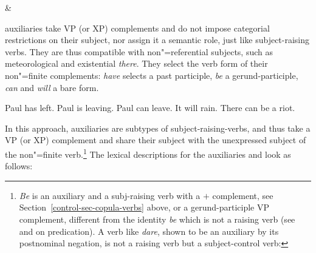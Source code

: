 \begin{exe}
\ex \label{ex-head-value-of-aux-elements}
   \impl {} \& 
\avm{[head &	[aux & $+$] ]}
 \end{exe}
 
  auxiliaries take VP (or XP) complements and do not impose categorial restrictions on their subject, nor assign it a semantic role,
   just like
 subject-raising verbs. They are thus compatible with non"=referential subjects, such as
 meteorological  and existential \textit{there}. They select the verb form of their
 non"=finite complements: \textit{have} selects a past participle, \textit{be} a gerund-participle,
 \textit{can} and \textit{will} a bare form.

	
\begin{exe}
\ex \begin{xlist}
\ex Paul has left.
\ex Paul is leaving.
\ex Paul can leave.
\ex It will rain.
\ex There can be a riot.
\end{xlist}	
\end{exe}

In this approach,  auxiliaries are subtypes of subject-raising-verbs, and thus take a VP (or
XP) complement and share their subject with the unexpressed subject of the non"=finite verb.\footnote{ \emph{Be} is an auxiliary and a subj-raising verb with a \prd$+$ complement, see
  Section~\ref{control-sec-copula-verbs} above, or a gerund-participle VP complement,
  different from the identity \emph{be} which is not a raising verb (see  and
   on predication). A verb like \emph{dare}, shown to be an auxiliary by
  its postnominal negation, is not a raising verb but a subject-control verb:
\eal
{}
\zllast
}
The lexical descriptions for the auxiliaries  and  look as follows: 

